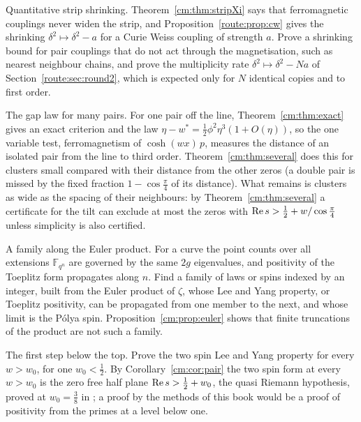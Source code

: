 \begin{problem}\label{route:prob:shrink}
Quantitative strip shrinking. Theorem~\ref{cm:thm:stripXi} says that ferromagnetic couplings never widen the strip, and Proposition~\ref{route:prop:cw} gives the shrinking $\delta^2\mapsto\delta^2-a$ for a Curie Weiss coupling of strength $a$. Prove a shrinking bound for pair couplings that do not act through the magnetisation, such as nearest neighbour chains, and prove the multiplicity rate $\delta^2\mapsto\delta^2-Na$ of Section~\ref{route:sec:round2}, which is expected only for $N$ identical copies and to first order.
\end{problem}

\begin{problem}\label{route:prob:gap}
The gap law for many pairs. For one pair off the line, Theorem~\ref{cm:thm:exact} gives an exact criterion and the law $\eta-w^*=\frac12\phi^2\eta^3(1+O(\eta))$, so the one variable test, ferromagnetism of $\cosh(wx)\,p$, measures the distance of an isolated pair from the line to third order. Theorem~\ref{cm:thm:several} does this for clusters small compared with their distance from the other zeros (a double pair is missed by the fixed fraction $1-\cos\frac\pi4$ of its distance). What remains is clusters as wide as the spacing of their neighbours: by Theorem~\ref{cm:thm:several} a certificate for the tilt can exclude at most the zeros with $\operatorname{Re} s>\frac12+w/\cos\frac\pi4$ unless simplicity is also certified.
\end{problem}

\begin{problem}\label{route:prob:family}
A family along the Euler product. For a curve the point counts over all extensions $\mathbb F_{q^n}$ are governed by the same $2g$ eigenvalues, and positivity of the Toeplitz form propagates along $n$. Find a family of laws or spins indexed by an integer, built from the Euler product of $\zeta$, whose Lee and Yang property, or Toeplitz positivity, can be propagated from one member to the next, and whose limit is the P\'olya spin. Proposition~\ref{cm:prop:euler} shows that finite truncations of the product are not such a family.
\end{problem}

\begin{problem}\label{route:prob:qrh}
The first step below the top. Prove the two spin Lee and Yang property for every $w>w_0$, for one $w_0<\frac12$. By Corollary~\ref{cm:cor:pair} the two spin form at every $w>w_0$ is the zero free half plane $\operatorname{Re} s>\frac12+w_0$, the quasi Riemann hypothesis, proved at $w_0=\frac38$ in \cite{OAI26a}; a proof by the methods of this book would be a proof of positivity from the primes at a level below one.
\end{problem}

